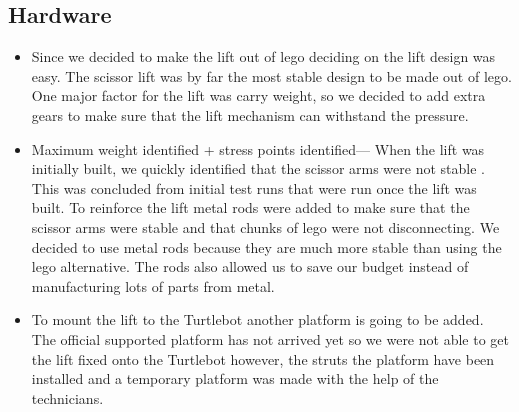 \documentclass{article}
\begin{document}
\subsection{Hardware}
\begin{itemize}
\item Since we decided to make the lift out of lego deciding on the lift design was easy. The scissor lift was by far the most stable design to be made out of lego. One major factor for the lift was carry weight, so we decided to add extra gears to make sure that the lift mechanism can withstand the pressure.
\item Maximum weight identified + stress points identified--- When the lift was initially built, we quickly identified that the scissor arms were not stable . This was concluded from initial test runs that were run once the lift was built. To reinforce the lift metal rods were added to make sure that the scissor arms were stable and that chunks of lego were not disconnecting. We decided to use metal rods because they are much more stable than using the lego alternative. The rods also allowed us to save our budget instead of manufacturing lots of parts from metal.
\item  To mount the lift to the Turtlebot another platform is going to be added. The official supported platform has not arrived yet so we were not able to get the lift fixed onto the Turtlebot however, the struts the platform have been installed and a temporary platform was made with the help of the technicians.
\end{itemize}
\end{document}
